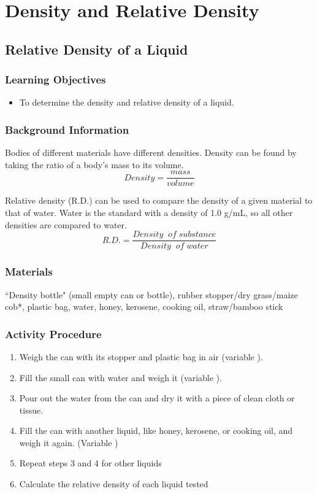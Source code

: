 \section{Density and Relative Density}

\subsection{Relative Density of a Liquid}

\subsubsection*{Learning Objectives}
\begin{itemize}
\item{To determine the density and relative density of a liquid.} 
\end{itemize}

\subsubsection*{Background Information}
Bodies of different materials have different densities.  Density can be found by taking the ratio of a body's mass to its volume.  $$Density = \frac{mass}{volume} $$

Relative density (R.D.) can be used to compare the density of a given material to that of water.  Water is the standard with a density of 1.0 g/mL, so all other densities are compared to water.
$$R.D. = \frac{Density\; \; of \;substance}{Density\; \;of \;water}$$

\subsubsection*{Materials}
``Density bottle" (small empty can or bottle), rubber stopper/dry grass/maize cob*, plastic bag, water, honey, kerosene, cooking oil, straw/bamboo stick


\subsubsection*{Activity Procedure}
\begin{enumerate}
\item{Weigh the can with its stopper and plastic bag in air (variable ).} 
\item{Fill the small can with water and weigh it (variable ).} 
\item{Pour out the water from the can and dry it with a piece of clean cloth or tissue.} 
\item{Fill the can with another liquid, like honey, kerosene, or cooking oil, and weigh it again. (Variable )}
\item{Repeat steps 3 and 4 for other liquids}
\item Calculate the relative density of each liquid tested
\end{enumerate}

